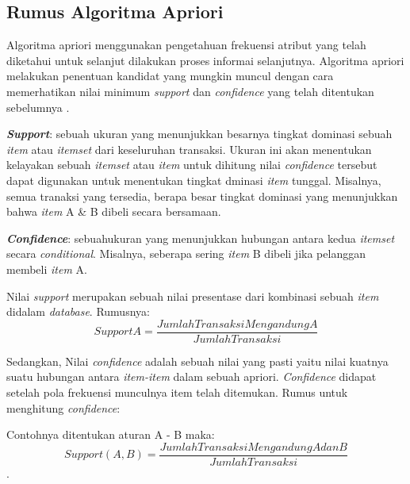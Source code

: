 \subsection{Rumus Algoritma Apriori}
\par Algoritma apriori menggunakan pengetahuan frekuensi atribut yang telah diketahui untuk selanjut dilakukan proses informai selanjutnya. Algoritma apriori melakukan penentuan kandidat yang mungkin muncul dengan cara memerhatikan nilai  minimum \textit{support} dan \textit{confidence} yang telah ditentukan sebelumnya \cite{yanto2015implementasi}.

\par 
\textbf{\textit{Support}}: sebuah ukuran yang menunjukkan besarnya tingkat dominasi sebuah \textit{item} atau \textit{itemset} dari keseluruhan transaksi. Ukuran ini akan menentukan kelayakan sebuah \textit{itemset} atau \textit{item} untuk dihitung nilai \textit{confidence} tersebut dapat digunakan untuk menentukan tingkat dminasi \textit{item} tunggal. Misalnya, semua tranaksi yang tersedia, berapa besar tingkat dominasi yang menunjukkan bahwa \textit{item} A \& B dibeli secara bersamaan.
\par
\textbf{\textit{Confidence}}: sebuahukuran yang menunjukkan hubungan antara kedua \textit{itemset} secara \textit{conditional}. Misalnya, seberapa sering \textit{item} B dibeli jika pelanggan membeli \textit{item} A.

\par
Nilai \textit{support} merupakan sebuah nilai presentase dari kombinasi sebuah \textit{item} didalam \textit{database}.
Rumusnya:
\begin{equation}
    Support A =\frac{Jumlah Transaksi Mengandung A}{Jumlah Transaksi} 
\end{equation}
\par
Sedangkan, Nilai \textit{confidence} adalah sebuah nilai yang pasti yaitu nilai kuatnya suatu hubungan antara \textit{item-item} dalam sebuah apriori. \textit{Confidence} didapat setelah pola frekuensi munculnya item telah ditemukan. Rumus untuk menghitung \textit{confidence}:
\par
Contohnya ditentukan aturan A - B maka:
 \begin{equation}
    Support (A,B) =\frac{Jumlah Transaksi Mengandung A dan B}{Jumlah Transaksi} 
\end{equation}
.
\\
\\
\\
\\
\\
\\
\\
\\
\\
\\
\\
\\
\\
\\
